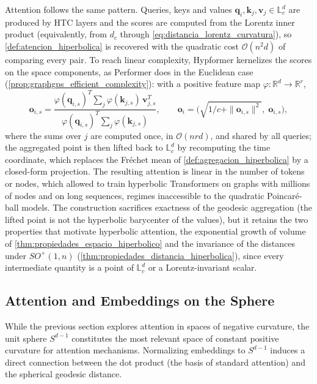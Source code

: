 Attention follows the same pattern. Queries, keys and values $\mathbf{q}_i, \mathbf{k}_j, \mathbf{v}_j \in \mathbb{L}^d_c$ are produced by HTC layers and the scores are computed from the Lorentz inner product (equivalently, from $d_c$ through \eqref{eq:distancia_lorentz_curvatura}), so \autoref{def:atencion_hiperbolica} is recovered with the quadratic cost $\mathcal{O}(n^2 d)$ of comparing every pair. To reach linear complexity, Hypformer kernelizes the scores on the space components, as Performer does in the Euclidean case (\autoref{prop:graphgps_efficient_complexity}): with a positive feature map $\varphi: \mathbb{R}^d \to \mathbb{R}^{r}$,
\begin{equation}
    \mathbf{o}_{i,s} = \frac{\varphi(\mathbf{q}_{i,s})^T \sum_{j} \varphi(\mathbf{k}_{j,s})\, \mathbf{v}_{j,s}^T}{\varphi(\mathbf{q}_{i,s})^T \sum_{j} \varphi(\mathbf{k}_{j,s})},
    \qquad
    \mathbf{o}_i = \Big(\sqrt{1/c + \|\mathbf{o}_{i,s}\|^2}, \; \mathbf{o}_{i,s}\Big),
    \label{eq:hypformer_atencion_lineal}
\end{equation}
where the sums over $j$ are computed once, in $\mathcal{O}(n r d)$, and shared by all queries; the aggregated point is then lifted back to $\mathbb{L}^d_c$ by recomputing the time coordinate, which replaces the Fréchet mean of \autoref{def:agregacion_hiperbolica} by a closed-form projection. The resulting attention is linear in the number of tokens or nodes, which allowed \citet{yang2024hypformer} to train hyperbolic \glspl{Transformer} on graphs with millions of nodes and on long sequences, regimes inaccessible to the quadratic Poincaré-ball models. The construction sacrifices exactness of the geodesic aggregation (the lifted point is not the hyperbolic barycenter of the values), but it retains the two properties that motivate hyperbolic attention, the exponential growth of volume of \autoref{thm:propiedades_espacio_hiperbolico} and the invariance of the distances under $SO^+(1,n)$ (\autoref{thm:propiedades_distancia_hiperbolica}), since every intermediate quantity is a point of $\mathbb{L}^d_c$ or a Lorentz-invariant scalar.

\subsection{Attention and Embeddings on the Sphere}\label{subsec:atencion_esfera}

While the previous section explores attention in spaces of negative curvature, the unit sphere $S^{d-1}$ constitutes the most relevant space of constant positive curvature for attention mechanisms. Normalizing embeddings to $S^{d-1}$ induces a direct connection between the dot product (the basis of standard attention) and the spherical geodesic distance.

